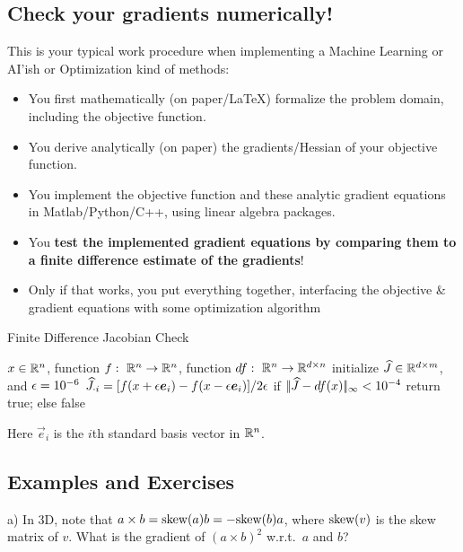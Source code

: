 \subsection{Check your gradients numerically!}

This is your typical work procedure when implementing a Machine
Learning or AI'ish or Optimization kind of methods:
\begin{itemize}
\item You first mathematically (on paper/LaTeX) formalize the problem
domain, including the objective function.
\item You derive analytically (on paper) the gradients/Hessian of your
objective function.
\item You implement the objective function and these analytic gradient
equations in Matlab/Python/C++, using linear algebra packages.
\item You \textbf{test the implemented gradient equations by comparing
them to a finite difference estimate of the gradients}!
\item Only if that works, you put everything together, interfacing the
objective \& gradient equations with some optimization algorithm
\end{itemize}

\begin{algorithm}
\caption{Finite Difference Jacobian Check}
\begin{algorithmic}[1]
\Require $x\in{\mathbb{R}}^n$, function $f:~ {\mathbb{R}}^n \to {\mathbb{R}}^n$, function
$df:~ {\mathbb{R}}^n \to {\mathbb{R}}^{d\times n}$
\State initialize $\widehat J \in {\mathbb{R}}^{d\times m}$, and $\epsilon=10^{-6}$
\State $\widehat J_{\cdot i} =  [f(x + \epsilon \boldsymbol e_i) - f(x - \epsilon \boldsymbol e_i)]/2\epsilon$
\EndFor
\State if $|\!|\widehat J - df(x)|\!|_\infty < 10^{-4}$ return true; else false
\end{algorithmic}
Here $\vec e_i$ is the $i$th standard basis vector in ${\mathbb{R}}^n$.
\end{algorithm}


\subsection{Examples and Exercises}


a) In 3D, note that $a \times b = \text{skew}(a) b = - \text{skew}(b) a$, where
$\text{skew}(v)$ is the skew matrix of $v$. What is the gradient of
$(a \times b)^2$ w.r.t.\ $a$ and $b$?


